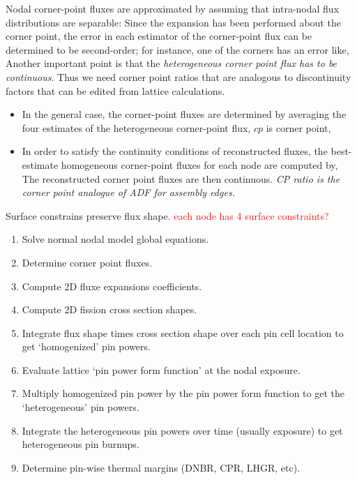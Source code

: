 \documentclass{school-22.211-notes}
\begin{document}
\clearpage
{}
Nodal corner-point fluxes are approximated by assuming that intra-nodal flux distributions are separable: 
Since the expansion has been performed about the corner point, the error in each estimator of the corner-point flux can be determined to be second-order; for instance, one of the corners has an error like, 
Another important point is that the \textit{heterogeneous corner point flux has to be continuous}. Thus we need corner point ratios that are analogous to discontinuity factors that can be edited from lattice calculations. 
\begin{itemize}
\item In the general case, the corner-point fluxes are determined by averaging the four estimates of the heterogeneous corner-point flux, $cp$ is corner point, 

\item In order to satisfy the continuity conditions of reconstructed fluxes, the best-estimate homogeneous corner-point fluxes for each node are computed by, 
  The reconstructed corner point fluxes are then continuous. \textit{CP ratio is the corner point analogue of ADF for assembly edges.}
\end{itemize}
Surface constrains preserve flux shape. \textcolor{red}{each node has 4 surface constraints?} 


\clearpage
{}
\begin{enumerate}
\item Solve normal nodal model global equations.
\item Determine corner point fluxes. 
\item Compute 2D fluxe expansions coefficients. 
\item Compute 2D fission cross section shapes.
\item Integrate flux shape times cross section shape over each pin cell location to get `homogenized' pin powers. 
\item Evaluate lattice `pin power form function' at the nodal exposure. 
\item Multiply homogenized pin power by the pin power form function to get the `heterogeneous' pin powers.
\item Integrate the heterogeneous pin powers over time (usually exposure) to get heterogeneous pin burnups. 
\item Determine pin-wise thermal margins (DNBR, CPR, LHGR, etc). 
\end{enumerate}
\end{document}
